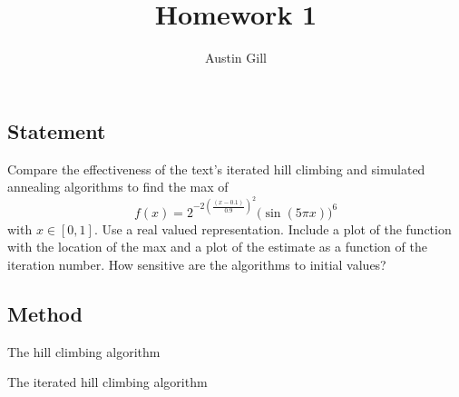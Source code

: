 \documentclass{article}
\title{Homework 1}
\author{Austin Gill}
\begin{document}
\maketitle


\section{}\label{prob:1}

\subsection{Statement}
Compare the effectiveness of the text's iterated hill climbing and simulated annealing algorithms
to find the max of
\[ f(x) = 2^{-2{\left(\frac{(x - 0.1)}{0.9}\right)}^2}{\big(\sin(5\pi x)\big)}^6\]
with $x\in [0,1]$. Use a real valued representation. Include a plot of the function with the
location of the max and a plot of the estimate as a function of the iteration number. How sensitive
are the algorithms to initial values?
\subsection{Method}

\begin{algorithm}
    \begin{algorithmic}
                \EndIf{}
            \EndWhile{}
            \State{}
        \EndFunction{}
    \end{algorithmic}
    \caption{The hill climbing algorithm}\label{alg:hill-climbing}
\end{algorithm}

\begin{algorithm}
    \begin{algorithmic}
            \State{}
        \EndFunction{}
    \end{algorithmic}
    \caption{The iterated hill climbing algorithm}\label{alg:iterated-hill-climbing}
\end{algorithm}
\end{document}
